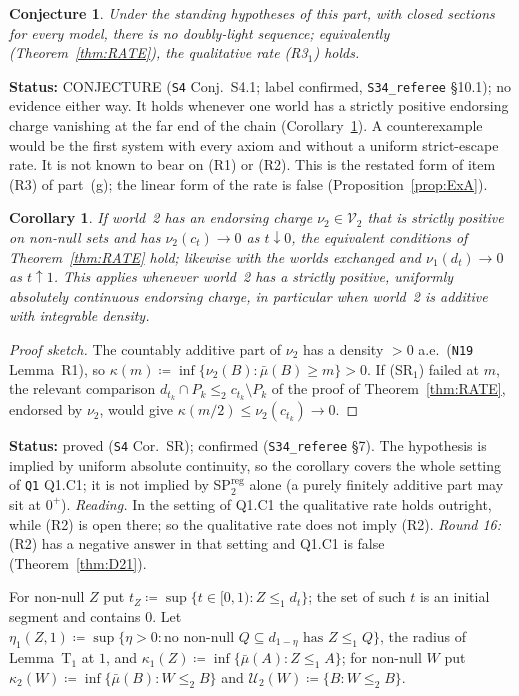 \documentclass[11pt]{article}
\newtheorem{corollary}[theorem]{Corollary}
\newtheorem{conjecture}[theorem]{Conjecture}
\theoremstyle{definition}
\theoremstyle{remark}
\newcommand{\src}[1]{\texttt{#1}}
\newcommand{\status}[1]{\par\smallskip\noindent\textbf{Status:} #1\par\smallskip}
\begin{document}
\begin{conjecture}\label{conj:NDL}
Under the standing hypotheses of this part, with closed sections for every model, there is no doubly-light sequence; equivalently (Theorem~\ref{thm:RATE}), the qualitative rate (R3$_1$) holds.
\end{conjecture}
\status{CONJECTURE (\src{S4} Conj.~S4.1; label confirmed, \src{S34\_referee} \S10.1); no evidence either way. It holds whenever one world has a strictly positive endorsing charge vanishing at the far end of the chain (Corollary~\ref{cor:SR}). A counterexample would be the first system with every axiom and without a uniform strict-escape rate. It is not known to bear on (R1) or (R2). This is the restated form of item (R3) of part~(g); the linear form of the rate is false (Proposition~\ref{prop:ExA}).}

\begin{corollary}\label{cor:SR}
If world~2 has an endorsing charge $\nu_2\in\mathcal V_2$ that is strictly positive on non-null sets and has $\nu_2(c_t)\to0$ as $t\downarrow0$, the equivalent conditions of Theorem~\ref{thm:RATE} hold; likewise with the worlds exchanged and $\nu_1(d_t)\to0$ as $t\uparrow1$. This applies whenever world~2 has a strictly positive, uniformly absolutely continuous endorsing charge, in particular when world~2 is additive with integrable density.
\end{corollary}
\begin{proof}[Proof sketch]
The countably additive part of $\nu_2$ has a density $>0$ a.e.\ (\src{N19} Lemma~R1), so $\kappa(m)\coloneqq\inf\{\nu_2(B):\bar\mu(B)\ge m\}>0$. If (SR$_1$) failed at $m$, the relevant comparison $d_{t_k}\cap P_k\le_2c_{t_k}\setminus P_k$ of the proof of Theorem~\ref{thm:RATE}, endorsed by $\nu_2$, would give $\kappa(m/2)\le\nu_2(c_{t_k})\to0$.
\end{proof}
\status{proved (\src{S4} Cor.~SR); confirmed (\src{S34\_referee} \S7). The hypothesis is implied by uniform absolute continuity, so the corollary covers the whole setting of \src{Q1} Q1.C1; it is not implied by SP$^{\mathrm{reg}}_2$ alone (a purely finitely additive part may sit at $0^+$). \emph{Reading.} In the setting of Q1.C1 the qualitative rate holds outright, while (R2) is open there; so the qualitative rate does not imply (R2). \emph{Round 16:} (R2) has a negative answer in that setting and Q1.C1 is false (Theorem~\ref{thm:D21}).}

For non-null $Z$ put $t_Z\coloneqq\sup\{t\in[0,1):Z\le_1d_t\}$; the set of such $t$ is an initial segment and contains $0$. Let $\eta_1(Z,1)\coloneqq\sup\{\eta>0:\text{no non-null }Q\subseteq d_{1-\eta}\text{ has }Z\le_1Q\}$, the radius of Lemma~T$_1$ at $1$, and $\kappa_1(Z)\coloneqq\inf\{\bar\mu(A):Z\le_1A\}$; for non-null $W$ put $\kappa_2(W)\coloneqq\inf\{\bar\mu(B):W\le_2B\}$ and $\mathcal U_2(W)\coloneqq\{B:W\le_2B\}$.
\end{document}
